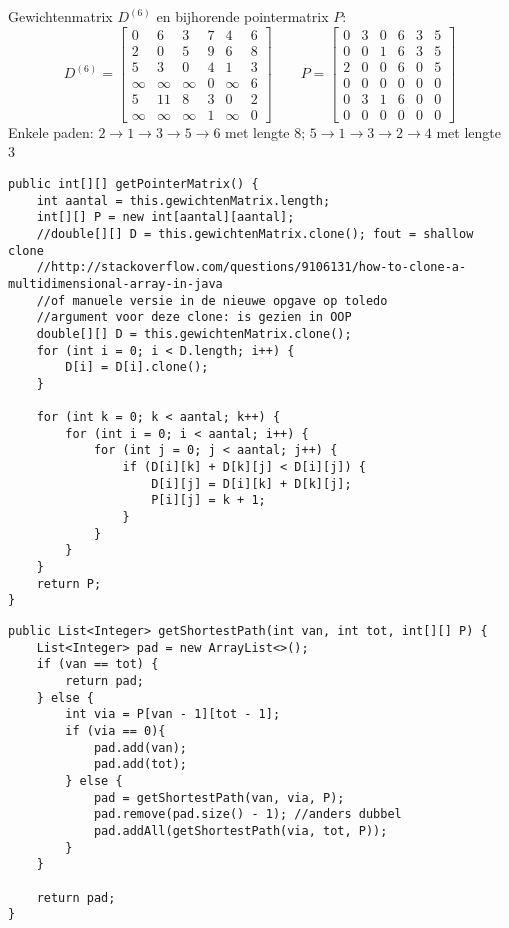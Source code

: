 \begin{Oplossing}{8.1}
Gewichtenmatrix $D^{(6)}$ en bijhorende pointermatrix $P$:
\begin{equation*}
D^{(6)}=\begin{bmatrix}
0 & 6 & 3 & 7 & 4 & 6\\
2 & 0 & 5 & 9 & 6 & 8\\
5 & 3 & 0 & 4 & 1 & 3\\
\infty & \infty & \infty & 0 & \infty & 6 \\
5 & 11 & 8 & 3 & 0 & 2\\
\infty & \infty & \infty & 1 & \infty & 0
\end{bmatrix}
\qquad
P=\begin{bmatrix}
0 & 3 & 0 & 6 & 3 & 5 \\
0 & 0 & 1 & 6 & 3 & 5\\
2 &0 &0 & 6 & 0 & 5\\
0 & 0 & 0 & 0 & 0 & 0 \\
0 &  3 & 1 & 6 & 0 & 0 \\
0 & 0 & 0 & 0 & 0 & 0
\end{bmatrix}
\end{equation*}
Enkele paden: $2\rightarrow1\rightarrow3\rightarrow5\rightarrow6$ met lengte 8; $5 \rightarrow 1 \rightarrow 3 \rightarrow  2\rightarrow 4$ met lengte 3
\end{Oplossing}
\begin{Oplossing}{8.2}
\begin{lstlisting}[caption={getPointerMatrix}, label=FloydgetPointerMatrix]
public int[][] getPointerMatrix() {
	int aantal = this.gewichtenMatrix.length;
	int[][] P = new int[aantal][aantal];
	//double[][] D = this.gewichtenMatrix.clone(); fout = shallow clone
	//http://stackoverflow.com/questions/9106131/how-to-clone-a-multidimensional-array-in-java
	//of manuele versie in de nieuwe opgave op toledo
	//argument voor deze clone: is gezien in OOP
	double[][] D = this.gewichtenMatrix.clone();
	for (int i = 0; i < D.length; i++) {
	    D[i] = D[i].clone();
	}

	for (int k = 0; k < aantal; k++) {
		for (int i = 0; i < aantal; i++) {
			for (int j = 0; j < aantal; j++) {
				if (D[i][k] + D[k][j] < D[i][j]) {
					D[i][j] = D[i][k] + D[k][j];
					P[i][j] = k + 1;
				}
			}
		}
	}
	return P;
}
\end{lstlisting}
\end{Oplossing}
\begin{Oplossing}{8.3}
\begin{lstlisting}[caption={getShortestPath}, label=FloydgetShortestPath]
public List<Integer> getShortestPath(int van, int tot, int[][] P) {
	List<Integer> pad = new ArrayList<>();
	if (van == tot) {
		return pad;
	} else {
		int via = P[van - 1][tot - 1];
		if (via == 0){
			pad.add(van);
			pad.add(tot);
		} else {
			pad = getShortestPath(van, via, P);
			pad.remove(pad.size() - 1); //anders dubbel
			pad.addAll(getShortestPath(via, tot, P));
		}
	}

	return pad;
}
\end{lstlisting}
\end{Oplossing}
